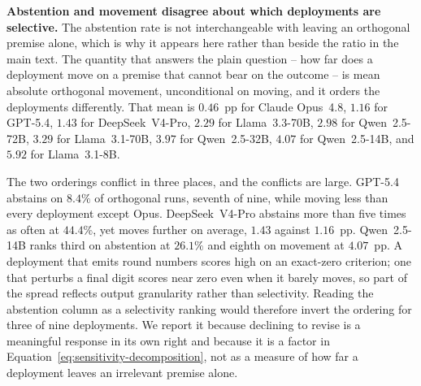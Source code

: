 \begin{center}
\begin{minipage}{\linewidth}
\centering
{}
\label{tab:exp1-abstention}
\scriptsize
\setlength{\tabcolsep}{4pt}
\resizebox{\linewidth}{!}{%

}
\end{minipage}
\end{center}

\textbf{Abstention and movement disagree about which deployments are selective.}
The abstention rate is not interchangeable with leaving an orthogonal premise
alone, which is why it appears here rather than beside the ratio in the main
text. The quantity that answers the plain question -- how far does a deployment
move on a premise that cannot bear on the outcome -- is mean absolute orthogonal
movement, unconditional on moving, and it orders the deployments differently.
That mean is $0.46$~pp for Claude Opus~4.8, $1.16$ for GPT-5.4, $1.43$ for
DeepSeek~V4-Pro, $2.29$ for Llama~3.3-70B, $2.98$ for Qwen~2.5-72B, $3.29$ for
Llama~3.1-70B, $3.97$ for Qwen~2.5-32B, $4.07$ for Qwen~2.5-14B, and $5.92$ for
Llama~3.1-8B.

The two orderings conflict in three places, and the conflicts are large. GPT-5.4
abstains on $8.4\%$ of orthogonal runs, seventh of nine, while moving less than
every deployment except Opus. DeepSeek~V4-Pro abstains more than five times as
often at $44.4\%$, yet moves further on average, $1.43$ against $1.16$~pp.
Qwen~2.5-14B ranks third on abstention at $26.1\%$ and eighth on movement at
$4.07$~pp. A deployment that emits round numbers scores high on an exact-zero
criterion; one that perturbs a final digit scores near zero even when it barely
moves, so part of the spread reflects output granularity rather than selectivity.
Reading the abstention column as a selectivity ranking would therefore invert the
ordering for three of nine deployments. We report it because declining to revise
is a meaningful response in its own right and because it is a factor in
Equation~\ref{eq:sensitivity-decomposition}, not as a measure of how far a
deployment leaves an irrelevant premise alone.

